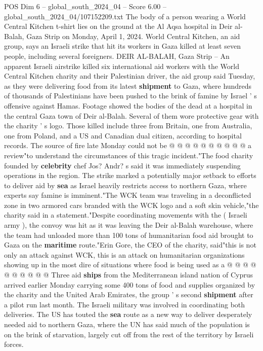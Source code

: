 \begin{textsample}{POS Dim 6 – global\_south\_2024\_04 – Score 6.00 – global\_south\_2024\_04/107152209.txt}  \label{ex:f6_pos_127}
The body of a person wearing a World Central Kitchen t-shirt lies on the ground at the Al Aqsa hospital in Deir al-Balah, Gaza Strip on Monday, April 1, 2024.
World Central Kitchen, an aid group, says an Israeli strike that hit its workers in Gaza killed at least seven people, including several foreigners.
DEIR AL-BALAH, Gaza Strip -- An apparent Israeli airstrike killed six international aid workers with the World Central Kitchen charity and their Palestinian driver, the aid group said Tuesday, as they were delivering food from its latest \textbf{shipment} to Gaza, where hundreds of thousands of Palestinians have been pushed to the brink of famine by Israel ' s offensive against Hamas.
Footage showed the bodies of the dead at a hospital in the central Gaza town of Deir al-Balah.
Several of them wore protective gear with the charity ' s logo.
Those killed include three from Britain, one from Australia, one from Poland, and a US and Canadian dual citizen, according to hospital records.
The source of fire late Monday could not be @ @ @ @ @ @ @ @ @ @ a review"to understand the circumstances of this tragic incident."The food charity founded by \textbf{celebrity} chef Jos?
Andr? s said it was immediately suspending operations in the region.
The strike marked a potentially major setback to efforts to deliver aid by \textbf{sea} as Israel heavily restricts access to northern Gaza, where experts say famine is imminent."The WCK team was traveling in a deconflicted zone in two armored cars branded with the WCK logo and a soft skin vehicle,"the charity said in a statement."Despite coordinating movements with the ( Israeli army ), the convoy was hit as it was leaving the Deir al-Balah warehouse, where the team had unloaded more than 100 tons of humanitarian food aid brought to Gaza on the \textbf{maritime} route."Erin Gore, the CEO of the charity, said"this is not only an attack against WCK, this is an attack on humanitarian organizations showing up in the most dire of situations where food is being used as a @ @ @ @ @ @ @ @ @ @ Three aid \textbf{ships} from the Mediterranean island nation of Cyprus arrived earlier Monday carrying some 400 tons of food and supplies organized by the charity and the United Arab Emirates, the group ' s second \textbf{shipment} after a pilot run last month.
The Israeli military was involved in coordinating both deliveries.
The US has touted the \textbf{sea} route as a new way to deliver desperately needed aid to northern Gaza, where the UN has said much of the population is on the brink of starvation, largely cut off from the rest of the territory by Israeli forces.

\end{textsample}
